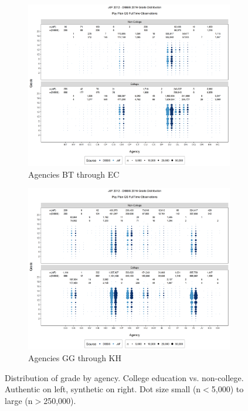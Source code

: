 \documentclass[10pt, letterpaper]{article}
\begin{document}
\begin{spacing}{1.0}
\clearpage

\begin{figure}[]
    \centering
    \begin{subfigure}{1\textwidth}
        \centering
        \includegraphics[width=6in, trim={0 0.55in 0 0.75in}, clip]{JdFDIBBSGSFullTimeGradeCollegeAgency21.png}
        \caption{Agencies BT through EC}
        \vspace{10pt}
    \end{subfigure}
    \begin{subfigure}{1\textwidth}
        \centering
        \includegraphics[width=6in, trim={0 0.55in 0 0.75in}, clip]{JdFDIBBSGSFullTimeGradeCollegeAgency61.png}
        \caption{Agencies GG through KH}
    \end{subfigure}
    \caption{Distribution of grade by agency.  College education vs. non-college.  Authentic on left, synthetic on right.  Dot size small (n$<$5,000) to large (n$>$250,000).}
    \label{figure:JdFDIBBSGSFullTimeGradeCollegeAgency}
\end{figure}


\end{spacing}
\end{document}
